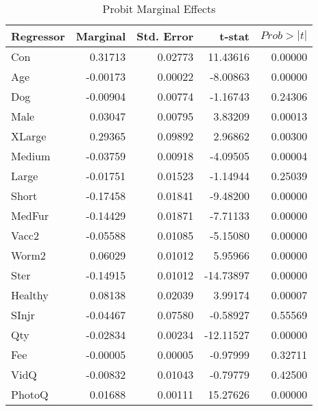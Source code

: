 \documentclass[12pt]{article}
\begin{document}
	\begin{table}[h]
		\centering
		\caption{Probit Marginal Effects}
		\begin{tabular}{@{}lrrrr@{}}
			\toprule
			Regressor & Marginal & Std. Error & t-stat    & $ Prob>|t| $ \\ \midrule
			Con       & 0.31713  & 0.02773    & 11.43616  & 0.00000  \\
			Age       & -0.00173 & 0.00022    & -8.00863  & 0.00000  \\
			Dog       & -0.00904 & 0.00774    & -1.16743  & 0.24306  \\
			Male      & 0.03047  & 0.00795    & 3.83209   & 0.00013  \\
			XLarge    & 0.29365  & 0.09892    & 2.96862   & 0.00300  \\
			Medium    & -0.03759 & 0.00918    & -4.09505  & 0.00004  \\
			Large     & -0.01751 & 0.01523    & -1.14944  & 0.25039  \\
			Short     & -0.17458 & 0.01841    & -9.48200  & 0.00000  \\
			MedFur    & -0.14429 & 0.01871    & -7.71133  & 0.00000  \\
			Vacc2     & -0.05588 & 0.01085    & -5.15080  & 0.00000  \\
			Worm2     & 0.06029  & 0.01012    & 5.95966   & 0.00000  \\
			Ster      & -0.14915 & 0.01012    & -14.73897 & 0.00000  \\
			Healthy   & 0.08138  & 0.02039    & 3.99174   & 0.00007  \\
			SInjr     & -0.04467 & 0.07580    & -0.58927  & 0.55569  \\
			Qty       & -0.02834 & 0.00234    & -12.11527 & 0.00000  \\
			Fee       & -0.00005 & 0.00005    & -0.97999  & 0.32711  \\
			VidQ      & -0.00832 & 0.01043    & -0.79779  & 0.42500  \\
			PhotoQ    & 0.01688  & 0.00111    & 15.27626  & 0.00000  \\ \bottomrule
		\end{tabular}
		\label{table:3}
	\end{table}
\end{document}
